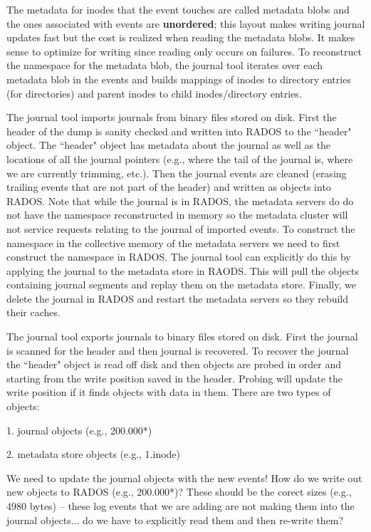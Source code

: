 \documentclass[preprint]{sigplanconf-eurosys}
\begin{document}
The metadata for inodes that the event touches are called metadata blobs and
the ones associated with events are \textbf{unordered}; this layout makes
writing journal updates fast but the cost is realized when reading the metadata
blobs.  It makes sense to optimize for writing since reading only occurs on
failures. To reconstruct the namespace for the metadata blob, the journal tool
iterates over each metadata blob in the events and builds mappings of inodes to
directory entries (for directories) and parent inodes to child inodes/directory
entries.

The journal tool imports journals from binary files stored on disk.  First the
header of the dump is sanity checked and written into RADOS to the ``header"
object.  The ``header" object has metadata about the journal as well as the
locations of all the journal pointers (e.g., where the tail of the journal is,
where we are currently trimming, etc.).  Then the journal events are cleaned
(erasing trailing events that are not part of the header) and written as
objects into RADOS.  Note that while the journal is in RADOS, the metadata
servers do do not have the namespace reconstructed in memory so the metadata
cluster will not service requests relating to the journal of imported events.
To construct the namespace in the collective memory of the metadata servers we
need to first construct the namespace in RADOS. The journal tool can explicitly
do this by  applying the journal to the metadata store in RAODS. This will pull
the objects containing journal segments and replay them on the metadata store.
Finally, we delete the journal in RADOS and restart the metadata servers so
they rebuild their caches.

The journal tool exports journals to binary files stored on disk. First the
journal is scanned for the header and then journal is recovered. To recover the
journal the ``header" object is read off disk and then objects are probed in
order and starting from the write position saved in the header. Probing will
update the write position if it finds objects with data in them. There are two
types of objects:

1. journal objects (e.g., 200.000*)

2. metadata store objects (e.g., 1.inode)

We need to update the journal objects with the new events! How do we write out
new objects to RADOS (e.g., 200.000*)? These should be the corect sizes (e.g.,
4980 bytes) -- these log events that we are adding are not making them into
the journal objects... do we have to explicitly read them and then re-write
them?
\end{document}
